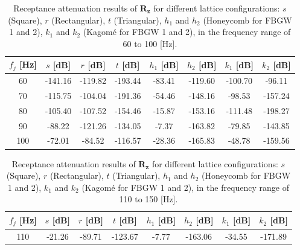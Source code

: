 \documentclass[review,numbers,sort&compress]{elsarticle}
\begin{document}
{\begin{table}[htb]
    \centering
    \caption{Receptance attenuation results of $\mathbf{R_z}$ for different lattice configurations: \( s \) (Square), \( r \) (Rectangular), \( t \) (Triangular), \( h_1 \) and \( h_2 \) (Honeycomb for FBGW 1 and 2), \( k_1 \) and \( k_2 \) (Kagomé for FBGW 1 and 2), in the frequency range of 60 to 100 [Hz].}
    \begin{tabular}{cccccccc}
        $f_j$ [Hz] & $s$  [dB] & $r$  [dB] & $t$  [dB] & $h_1$ [dB] & $h_2$ [dB] & $k_1$ [dB] & $k_2$ [dB] \\ \hline
        60         & -141.16           & -119.82                 & -193.44               & -83.41                & -119.60                 & -100.70               & -96.11                \\ \hline
        70         & -115.75           & -104.04                 & -191.36               & -54.46                & -148.16                 & -98.53                & -157.24               \\ \hline
        80         & -105.40           & -107.52                 & -154.46               & -15.87                & -153.16                 & -111.48               & -198.27               \\ \hline
        90         & -88.22            & -121.26                 & -134.05               & -7.37                 & -163.82                 & -79.85                & -143.85               \\ \hline
        100        & -72.01            & -84.52                  & -116.57               & -28.36                & -165.83                 & -48.78                & -159.56               \\ \hline
    \end{tabular}
    \label{tab_tr_lattices_60_100}
\end{table}
\newpage
\begin{table}[htb]
    \centering
    \caption{Receptance attenuation results of $\mathbf{R_z}$ for different lattice configurations: \( s \) (Square), \( r \) (Rectangular), \( t \) (Triangular), \( h_1 \) and \( h_2 \) (Honeycomb for FBGW 1 and 2), \( k_1 \) and \( k_2 \) (Kagomé for FBGW 1 and 2), in the frequency range of 110 to 150 [Hz].}
    \begin{tabular}{cccccccc}
        $f_j$ [Hz] & $s$  [dB] & $r$  [dB] & $t$  [dB] & $h_1$ [dB] & $h_2$ [dB] & $k_1$ [dB] & $k_2$ [dB] \\ \hline
        110        & -21.26            & -89.71                  & -123.67               & -7.77                & -163.06                 & -34.55                & -171.89               \\ \hline

\end{tabular}
\end{table}}
\end{document}
